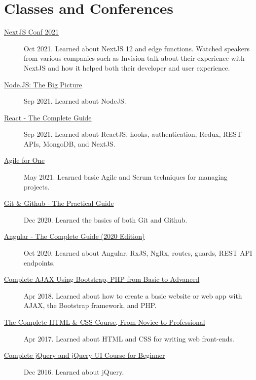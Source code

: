 \documentclass{article}
\begin{document}

\section{Classes and Conferences}

\begin{description}
  \item[\href{https://nextjs.org/conf}{NextJS Conf 2021}] Oct 2021. Learned about NextJS 12 and edge functions. Watched speakers from various companies such as Invision talk about their experience with NextJS and how it helped both their developer and user experience.
  \item[\href{https://sirkoik.github.io/CurriculumVitae/certifications/Nodejs-The-Big-Picture/certificate.pdf}{Node.JS: The Big Picture}] Sep 2021. Learned about NodeJS.
  \item[\href{https://www.udemy.com/certificate/UC-2196f0cf-2dce-4a11-9d8e-421827506ad1/}{React - The Complete Guide}] Sep 2021. Learned about ReactJS, hooks, authentication, Redux, REST APIs, MongoDB, and NextJS.
  \item[\href{https://sirkoik.github.io/CurriculumVitae/certifications/Agile-for-One/certificate.pdf}{Agile for One}] May 2021. Learned basic Agile and Scrum techniques for managing projects.
  \item[\href{https://sirkoik.github.io/CurriculumVitae/certifications/certificate-of-completion-for-git-github-the-practical-guide.pdf}{Git \& Github - The Practical Guide}] Dec 2020. Learned the basics of both Git and Github.
  \item[\href{https://www.udemy.com/certificate/UC-624f6f83-940e-428f-accd-d16113661ded}{Angular - The Complete Guide (2020 Edition)}] Oct 2020. Learned about Angular, RxJS, NgRx, routes, guards, REST API endpoints.
  \item[\href{https://www.udemy.com/certificate/UC-E3EMJE4O}{Complete AJAX Using Bootstrap, PHP from Basic to Advanced}] Apr 2018. Learned about how to create a basic website or web app with AJAX, the Bootstrap framework, and PHP.
  \item[\href{https://www.udemy.com/certificate/UC-QZDWYX3V}{The Complete HTML \& CSS Course, From Novice to Professional}] Apr 2017. Learned about HTML and CSS for writing web front-ends.
  \item[\href{https://www.udemy.com/certificate/UC-4V285L2N}{Complete jQuery and jQuery UI Course for Beginner}] Dec 2016. Learned about jQuery.
\end{description}
\end{document}
